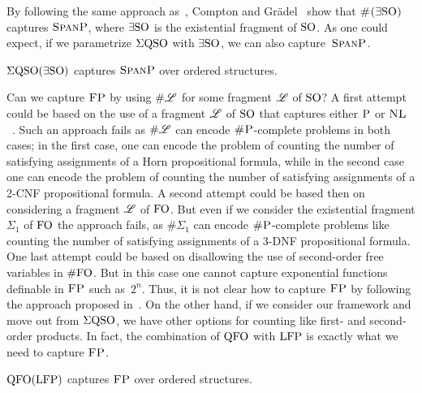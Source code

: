 By following the same approach as~\cite{SalujaST95}, Compton and Gr\"adel~\cite{ComptonG96} show that $\text{\sc \#($\exists{\rm SO}$)}$ captures $\text{\sc SpanP}$, where $\exists{\rm SO}$ is the existential fragment of ${\rm SO}$. As one could expect, if we parametrize $\Sigma{\rm QSO}$ with $\exists{\rm SO}$, we can also capture~$\text{\sc SpanP}$.
\begin{proposition} \label{prop:capture-spanP}
	$\Sigma{\rm QSO}(\exists{\rm SO})$ captures $\text{\sc SpanP}$ over ordered structures.
\end{proposition}
Can we capture $\text{\sc FP}$ by using $\# \mathscr{L}$ for some fragment $\mathscr{L}$ of ${\rm SO}$? A first attempt could be based on the use of a fragment $\mathscr{L}$ of ${\rm SO}$ that captures either $\text{\sc P}$ or $\text{\sc NL}$~\cite{G92}. Such an approach fails as $\# \mathscr{L}$ can encode $\text{\sc \#P}$-complete problems in both cases; in the first case, one can encode the problem of counting the number of satisfying assignments of a Horn  propositional formula, while in the second case one can encode the problem of counting the number of satisfying assignments of a 2-CNF propositional formula. A second attempt could be based then on considering a fragment $\mathscr{L}$ of ${\rm FO}$. 
But even if we consider the existential fragment $\Sigma_1$ of ${\rm FO}$ the approach fails, as $\# \Sigma_1$ can encode $\text{\sc \#P}$-complete problems like counting the number of satisfying assignments of a 3-DNF propositional formula\cite{SalujaST95}. One last attempt could be based on disallowing the use of second-order free variables in $\#{\rm FO}$. But in this case one 
cannot capture exponential functions definable in $\text{\sc FP}$ such as~$2^n$.
Thus, it is not  clear how to capture
$\text{\sc FP}$ 
by following the approach proposed in~\cite{SalujaST95}. 
On the other hand, if we consider our framework and move out from $\Sigma{\rm QSO}$, we have other options for counting like first- and second-order products. In fact, the combination of ${\rm QFO}$ with ${\rm LFP}$ is exactly what we need to capture $\text{\sc FP}$.
\begin{theorem} \label{theo:capture-fp}
	${\rm QFO}({\rm LFP})$ captures $\text{\sc FP}$ over ordered structures.
\end{theorem}
